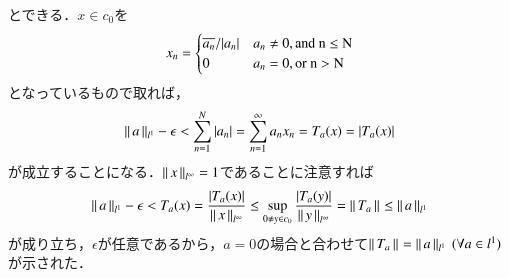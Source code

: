 \begin{prf}
\begin{description}
		とできる．$x \in c_0$を
		\begin{align}
			x_n = \begin{cases}
				\overline{a_n}/|a_n| & a_n \neq 0,\rm{and}\ n \leq N \\
				0 & a_n = 0,\rm{or}\ n > N
			\end{cases}
		\end{align}
		となっているもので取れば，
		\begin{align}
			\left\|\, a\, \right\|_{l^1} - \epsilon < \sum_{n = 1}^{N} |a_n| = \sum_{n = 1}^{\infty} a_n x_n = T_a(x) = |T_a(x)|
		\end{align}
		が成立することになる．$\left\|\, x\, \right\|_{l^{\infty}}=1$であることに注意すれば
		\begin{align}
			\left\|\, a\, \right\|_{l^1} - \epsilon 
			< T_a(x) = \frac{|T_a(x)|}{\left\|\, x\, \right\|_{l^{\infty}}} 
			\leq \operatorname*{sup}_{0 \neq y \in c_0} \frac{|T_a(y)|}{\left\|\, y\, \right\|_{l^{\infty}}} = \left\|\, T_a\, \right\|_{} \leq \left\|\, a\, \right\|_{l^1}
		\end{align}
		が成り立ち，$\epsilon$が任意であるから，$a=0$の場合と合わせて$\left\|\, T_a\, \right\|_{} = \left\|\, a\, \right\|_{l^1}\ (\forall a \in l^1)$が示された．
	

\end{description}
\end{prf}
